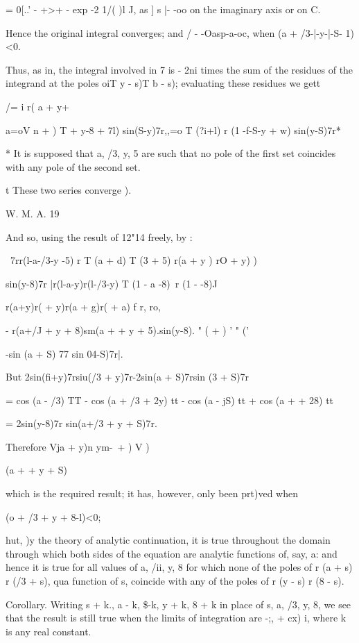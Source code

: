 = 0[..' - +>+ - exp -2 1/( )l J, as ] s |- -oo on the imaginary axis
or on C.

Hence the original integral converges; and / - -Oasp-a-oc, when (a +
/3-|-y-|-S- 1)<0.

Thus, as in, the integral involved in 7 is - 2ni times the sum
of the residues of the integrand at the poles oiT y - s)T b - s);
evaluating these residues we gett

/= i r( a + y+%

a=oV n + ) T + y-8 + 7l) sin(S-y)7r,,=o T (?i+l) r (1 -f-S-y + w)
sin(y-S)7r*

* It is supposed that a, /3, y, 5 are such that no pole of the first
set coincides with any pole of the second set.

t These two series converge ).

W. M. A. 19

%
%

And so, using the result of 12"14 freely, by :

\ 7rr(l-a-/3-y -5) r T (a + d) T (3 + 5) r(a + y ) rO + y) )

sin(y-8)7r |r(l-a-y)r(l-/3-y) T (1 - a -8)~r (1 - -8)J

r(a+y)r( + y)r(a + g)r( + a) f r, ro,

- r(a+/J + y + 8)sm(a + + y + 5).sin(y-8). " ( + ) ' " ('

-sin (a + S) 77 sin 04-S)7r|.

But 2sin(fi+y)7rsiu(/3 + y)7r-2sin(a + S)7rsin (3 + S)7r

= cos (a - /3) TT - cos (a + /3 + 2y) tt - cos (a - jS) tt + cos (a +
+ 28) tt

= 2sin(y-8)7r sin(a+/3 + y + S)7r.

Therefore Vja + y)n ym-\ + ) V )

 (a + + y + S)

which is the required result; it has, however, only been prt)ved when

 (o + /3 + y + 8-l)<0;

hut, )y the theory of analytic continuation, it is true throughout the
domain through which both sides of the equation are analytic functions
of, say, a: and hence it is true for all values of a, /ii, y, 8 for
which none of the poles of r (a + s) r (/3 + s), qua function of s,
coincide with any of the poles of r (y - s) r (8 - s).

Corollary. Writing s + k., a - k, \$-k, y + k, 8 + k in place of s, a,
/3, y, 8, we see that the result is still true when the limits of
integration are -;, + cx) i, where k is any real constant.

